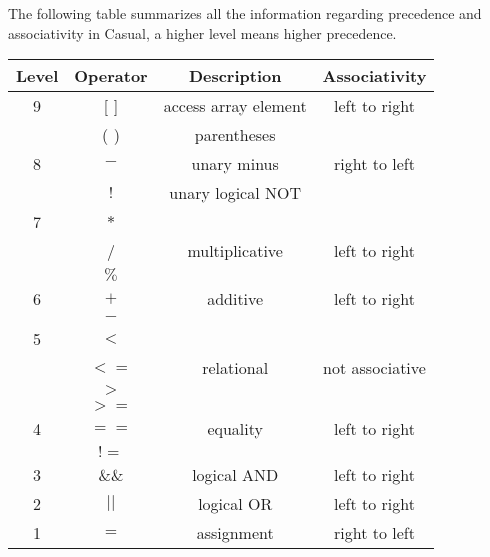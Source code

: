 \documentclass[12pt]{article}
\begin{document}
The following table summarizes all the information regarding precedence and associativity in Casual, a higher level means higher precedence.

\begin{table}[htb]
\centering
\begin{tabular}{| c | c | c | c |} 
 \hline
Level & Operator & Description & Associativity        \\ \hline
 9    & [ ]      & access array element & left to right \\ 
      & ( )      & parentheses          &  \\ \hline\hline
          
 8    & $- $     & unary minus          & right to left \\ 
      & $!$      & unary logical NOT    & \\ \hline\hline
      
 7    & $*$      &                      & \\ 
      & /        & multiplicative       & left to right \\
      & $\%$     &                      & \\ \hline\hline
      
 6    & $+$      & additive             & left to right\\
      & $-$      &                      & \\  \hline\hline
 
 5    & $< $     &                      & \\
      & $<=$     & relational           & not associative\\
      & $> $     &                      & \\
      & $>=$     &                      &  \\  \hline\hline 
      
 4    & $==$     & equality             & left to right\\
      & $!=$     &                      & \\ \hline\hline
      
 3    & $\&\&$   & logical AND          & left to right\\   \hline\hline
 
 2    & $||$     & logical OR           & left to right\\   \hline\hline
 
 1    & $=$      & assignment           & right to left \\   \hline
 
\end{tabular}
\end{table}
\end{document}
